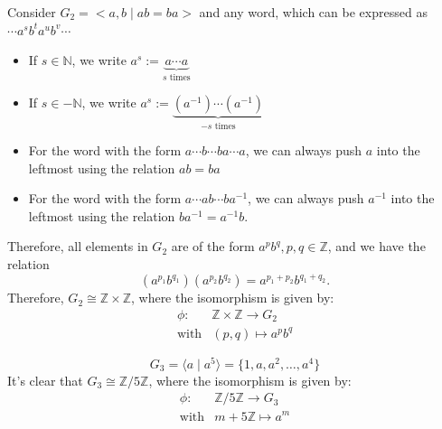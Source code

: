 \begin{example}
Consider $G_2=<a,b\mid ab=ba>$ and any word, which can be expressed as $\cdots a^sb^ta^ub^v\cdots$
\begin{itemize}
\item
If $s\in\mathbb{N}$, we write $a^s:=\underbrace{a\cdots a}_{s\text{ times}}$
\item
If $s\in-\mathbb{N}$, we write $a^s:=\underbrace{(a^{-1})\cdots (a^{-1})}_{-s\text{ times}}$
\item
For the word with the form $a\cdots b\cdots b a\cdots a$, we can always push $a$ into the leftmost using the relation $ab=ba$
\item
For the word with the form $a\cdots a b\cdots ba^{-1}$, we can always push $a^{-1}$ into the leftmost using the relation $ba^{-1}=a^{-1}b$.
\end{itemize}
Therefore, all elements in $G_2$ are of the form $a^pb^q,p,q\in\mathbb{Z}$, and we have the relation
\[(a^{p_1}b^{q_1})(a^{p_2}b^{q_2})=a^{p_1+p_2}b^{q_1+q_2}.\]
Therefore, $G_2\cong \mathbb{Z}\times\mathbb{Z}$, where the isomorphism is given by:
\[
\begin{array}{ll}
\phi:&\mathbb{Z}\times\mathbb{Z}\to G_2\\
\text{with}&(p,q)\mapsto a^pb^q
\end{array}
\]
\end{example}

\begin{example}
\[
G_3=\langle a\mid a^5\rangle=\{1,a,a^2,\dots,a^4\}
\]
It's clear that $G_3\cong \mathbb{Z}/5\mathbb{Z}$, where the isomorphism is given by:
\[
\begin{array}{ll}
\phi:&\mathbb{Z}/5\mathbb{Z}\to G_3\\
\text{with}&m+5\mathbb{Z}\mapsto a^m
\end{array}
\]
\end{example}

